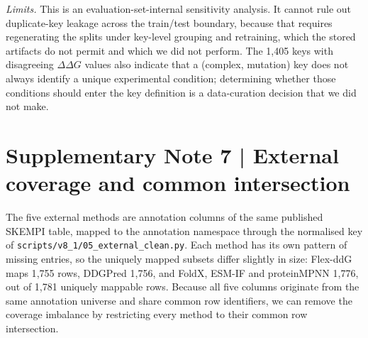 \documentclass[11pt,a4paper]{article}
\begin{document}
\emph{Limits.} This is an evaluation-set-internal sensitivity analysis. It cannot rule out
duplicate-key leakage across the train/test boundary, because that requires regenerating the
splits under key-level grouping and retraining, which the stored artifacts do not permit and
which we did not perform. The 1{,}405 keys with disagreeing $\Delta\Delta G$ values also
indicate that a (complex, mutation) key does not always identify a unique experimental
condition; determining whether those conditions should enter the key definition is a
data-curation decision that we did not make.

\section*{Supplementary Note 7 | External coverage and common intersection}
The five external methods are annotation columns of the same published SKEMPI table, mapped to
the annotation namespace through the normalised key of
\texttt{scripts/v8\_1/05\_external\_clean.py}. Each method has its own pattern of missing
entries, so the uniquely mapped subsets differ slightly in size: Flex-ddG maps 1{,}755 rows,
DDGPred 1{,}756, and FoldX, ESM-IF and proteinMPNN 1{,}776, out of 1{,}781 uniquely mappable
rows. Because all five columns originate from the same annotation universe and share common
row identifiers, we can remove the coverage imbalance by restricting every method to
their common row intersection.
\end{document}
